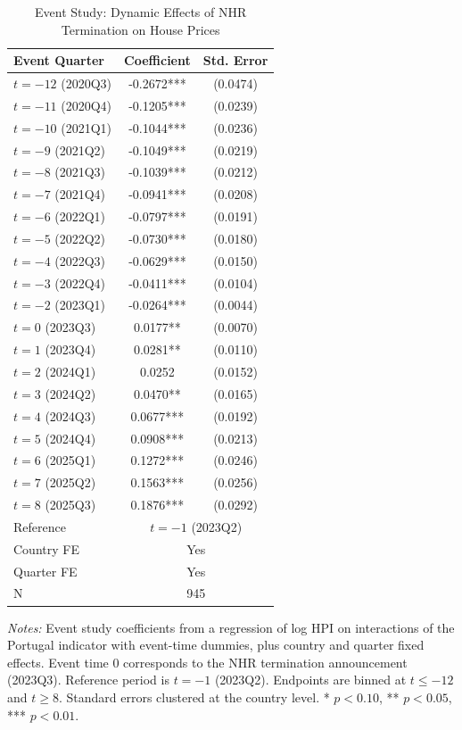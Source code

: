 \begin{table}[H]
\centering
\caption{Event Study: Dynamic Effects of NHR Termination on House Prices}
\begin{threeparttable}
\begin{tabular}{lcc}
\toprule
Event Quarter & Coefficient & Std. Error \\
\midrule
$t = -12$ (2020Q3) & -0.2672*** & (0.0474) \\
$t = -11$ (2020Q4) & -0.1205*** & (0.0239) \\
$t = -10$ (2021Q1) & -0.1044*** & (0.0236) \\
$t = -9$ (2021Q2) & -0.1049*** & (0.0219) \\
$t = -8$ (2021Q3) & -0.1039*** & (0.0212) \\
$t = -7$ (2021Q4) & -0.0941*** & (0.0208) \\
$t = -6$ (2022Q1) & -0.0797*** & (0.0191) \\
$t = -5$ (2022Q2) & -0.0730*** & (0.0180) \\
$t = -4$ (2022Q3) & -0.0629*** & (0.0150) \\
$t = -3$ (2022Q4) & -0.0411*** & (0.0104) \\
$t = -2$ (2023Q1) & -0.0264*** & (0.0044) \\
$t = 0$ (2023Q3) & 0.0177** & (0.0070) \\
$t = 1$ (2023Q4) & 0.0281** & (0.0110) \\
$t = 2$ (2024Q1) & 0.0252 & (0.0152) \\
$t = 3$ (2024Q2) & 0.0470** & (0.0165) \\
$t = 4$ (2024Q3) & 0.0677*** & (0.0192) \\
$t = 5$ (2024Q4) & 0.0908*** & (0.0213) \\
$t = 6$ (2025Q1) & 0.1272*** & (0.0246) \\
$t = 7$ (2025Q2) & 0.1563*** & (0.0256) \\
$t = 8$ (2025Q3) & 0.1876*** & (0.0292) \\
\midrule
Reference & \multicolumn{2}{c}{$t = -1$ (2023Q2)} \\
Country FE & \multicolumn{2}{c}{Yes} \\
Quarter FE & \multicolumn{2}{c}{Yes} \\
N & \multicolumn{2}{c}{945} \\
\bottomrule
\end{tabular}
\begin{tablenotes}[flushleft]
\small
\item \textit{Notes:} Event study coefficients from a regression of log HPI on interactions of the Portugal indicator with event-time dummies, plus country and quarter fixed effects. Event time 0 corresponds to the NHR termination announcement (2023Q3). Reference period is $t = -1$ (2023Q2). Endpoints are binned at $t \leq -12$ and $t \geq 8$. Standard errors clustered at the country level. * $p<0.10$, ** $p<0.05$, *** $p<0.01$.
\end{tablenotes}
\end{threeparttable}
\label{tab:event}
\end{table}

